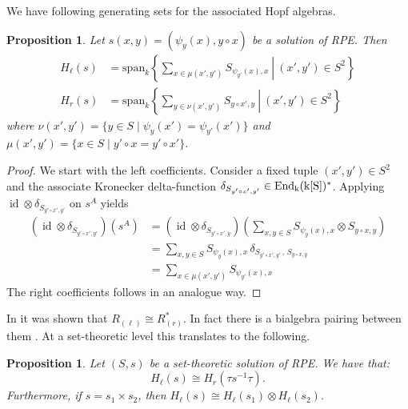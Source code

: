 \documentclass[a4paper,10pt]{amsart}
\newtheorem{proposition}[lemma]{Proposition}
\theoremstyle{definition}
\theoremstyle{remark}
\newcommand\End{\rm End}
\DeclareMathOperator{\id}{id}
\newcommand{\Span}{\mathrm{span}}
\newcommand\ot{\otimes}
\begin{document}
We have following generating sets for the associated Hopf algebras.

\begin{proposition}\label{leftrightinv}
Let $s(x,y) =(\psi_y(x), y \circ x)$ be a solution of RPE. Then
\begin{align}
    H_{\ell}(s) &= \Span_k\left\{\left.\sum\limits_{x \in \mu(x',y')} S_{\psi_{y'}(x),x}\ \right|\ (x',y')\in S^{2}\right\} \label{leftinv}\\
    H_r(s) &= \Span_k\left\{\left.\sum\limits_{ y \in \nu(x',y')} S_{y \circ x',y}\ \right|\ (x',y')\in S^{2}\right\} \label{rightinv}
\end{align}
where $\nu(x',y')= \{ y\in S\mid  \psi_y(x') = \psi_{y'}(x')\}$ and $\mu(x',y') = \{ x \in S \mid y'\circ x = y'\circ x' \}.$
\end{proposition}
\begin{proof}
We start with the left coefficients. Consider a fixed tuple $(x',y')\in S^2$ and the associate Kronecker delta-function $ \delta_{S_{y'\circ x',y'}} \in \End_k(k[S])^*$. Applying $\id \ot \delta_{S_{y'\circ x',y'}}$ on $s^{A}$ yields
\begin{align*}
    (\id \ot \delta_{S_{y'\circ x',y'}})(s^{A}) & = (\id \ot \delta_{S_{y'\circ x',y}}) \left( \sum\limits_{x,y\in S} S_{\psi_y(x), x}\otimes S_{y \circ x,y} \right) \\
    & =  \sum\limits_{x,y \in S} S_{\psi_y(x), x}\,  \delta_{S_{y'\circ x',y'} \,,\, S_{y \circ x,y}} \\
    & = \sum\limits_{x \in \mu(x',y')} S_{\psi_{y'}(x),x}\
\end{align*}
The right coefficients follows in an analogue way.
\end{proof}

In \cite[Theorem 2.1]{Mi04} it was shown that $R_{(\ell)} \cong R_{(r)}^*$. In fact there is a bialgebra pairing between them \cite[Lemma 5.2]{Dav}. At a set-theoretic level this translates to the following. 

\begin{proposition}\label{coefficients PE vs RPE}
Let $(S,s)$ be a set-theoretic solution of RPE. We have that:
$$H_{\ell}(s) \cong H_r(\tau s^{-1}\tau).$$
Furthermore, if $s = s_1 \times s_2$, then $H_{\ell}(s) \cong H_{\ell}(s_1) \ot H_{\ell}(s_2)$.
\end{proposition}
\end{document}
